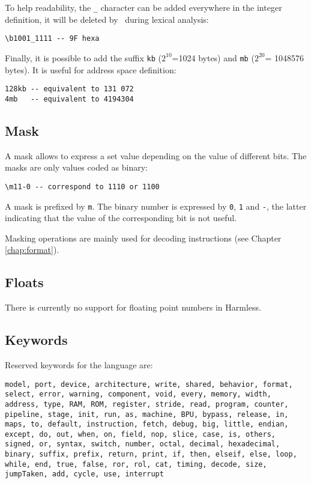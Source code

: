 To help readability, the \texttt{\_} character can be added everywhere in the integer definition, it will be deleted by \harmless\ during lexical analysis:
\begin{lstlisting}
\b1001_1111 -- 9F hexa
\end{lstlisting}

Finally, it is possible to add the suffix \texttt{kb} ($2^{10}$=1024 bytes) and \texttt{mb} ($2^{20}$= 1048576 bytes). It is useful for address space definition:
\begin{lstlisting}
128kb -- equivalent to 131 072
4mb   -- equivalent to 4194304
\end{lstlisting}

\subsection{Mask}
\label{masque}
A mask allows to express a set value depending on the value of different bits. The masks are only values coded as binary:
\begin{lstlisting}
\m11-0 -- correspond to 1110 or 1100
\end{lstlisting}
A mask is prefixed by \texttt{\bs m}. The binary number is expressed by \texttt{0}, \texttt{1} and \texttt{-}, the latter indicating that the value of the corresponding bit is not useful. 

Masking operations are mainly used for decoding instructions (see Chapter \ref{chap:format}).

\subsection{Floats} 
There is currently no support for floating point numbers in Harmless.

\subsection{Keywords}
\label{keywords}
Reserved keywords for the language are:
\begin{lstlisting}
model, port, device, architecture, write, shared, behavior, format, select, error, warning, component, void, every, memory, width, address, type, RAM, ROM, register, stride, read, program, counter, pipeline, stage, init, run, as, machine, BPU, bypass, release, in, maps, to, default, instruction, fetch, debug, big, little, endian, except, do, out, when, on, field, nop, slice, case, is, others, signed, or, syntax, switch, number, octal, decimal, hexadecimal, binary, suffix, prefix, return, print, if, then, elseif, else, loop, while, end, true, false, ror, rol, cat, timing, decode, size, jumpTaken, add, cycle, use, interrupt
\end{lstlisting}

